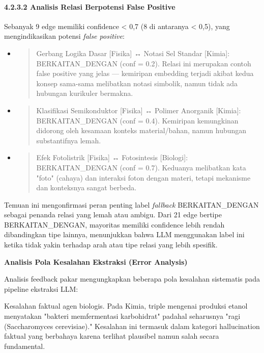 \documentclass[
]{article}
\begin{document}
\hypertarget{analisis-relasi-berpotensi-false-positive}{%
\paragraph{4.2.3.2 Analisis Relasi Berpotensi False
Positive}\label{analisis-relasi-berpotensi-false-positive}}

Sebanyak 9 edge memiliki confidence \textless{} 0,7 (8 di antaranya
\textless{} 0,5), yang mengindikasikan potensi \emph{false positive}:

\begin{itemize}
\item
  \begin{quote}
  Gerbang Logika Dasar {[}Fisika{]} ↔ Notasi Sel Standar {[}Kimia{]}:
  BERKAITAN\_DENGAN (conf = 0.2). Relasi ini merupakan contoh false
  positive yang jelas --- kemiripan embedding terjadi akibat kedua
  konsep sama-sama melibatkan notasi simbolik, namun tidak ada hubungan
  kurikuler bermakna.
  \end{quote}
\item
  \begin{quote}
  Klasifikasi Semikonduktor {[}Fisika{]} ↔ Polimer Anorganik
  {[}Kimia{]}: BERKAITAN\_DENGAN (conf = 0.4). Kemiripan kemungkinan
  didorong oleh kesamaan konteks material/bahan, namun hubungan
  substantifnya lemah.
  \end{quote}
\item
  \begin{quote}
  Efek Fotolistrik {[}Fisika{]} ↔ Fotosintesis {[}Biologi{]}:
  BERKAITAN\_DENGAN (conf = 0.7). Keduanya melibatkan kata "foto"
  (cahaya) dan interaksi foton dengan materi, tetapi mekanisme dan
  konteksnya sangat berbeda.
  \end{quote}
\end{itemize}

Temuan ini mengonfirmasi peran penting label \emph{fallback}
BERKAITAN\_DENGAN sebagai penanda relasi yang lemah atau ambigu. Dari 21
edge bertipe BERKAITAN\_DENGAN, mayoritas memiliki confidence lebih
rendah dibandingkan tipe lainnya, menunjukkan bahwa LLM menggunakan
label ini ketika tidak yakin terhadap arah atau tipe relasi yang lebih
spesifik.

\textbf{Analisis Pola Kesalahan Ekstraksi (Error Analysis)}

Analisis feedback pakar mengungkapkan beberapa pola kesalahan sistematis
pada pipeline ekstraksi LLM:

Kesalahan faktual agen biologis. Pada Kimia, triple mengenai produksi
etanol menyatakan "bakteri memfermentasi karbohidrat" padahal seharusnya
"ragi (Saccharomyces cerevisiae)." Kesalahan ini termasuk dalam kategori
hallucination faktual yang berbahaya karena terlihat plausibel namun
salah secara fundamental.
\end{document}

